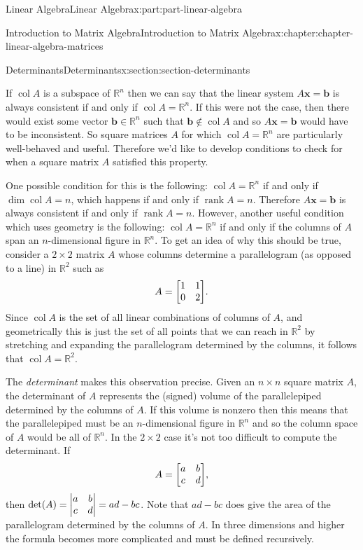\documentclass[twoside,10pt,]{book}
\numberwithin{equation}{part}
\newcommand{\RR}{\mathbb{R}}
\providecommand{\vb}[1]{\mathbf{#1}}
\newcommand{\col}[1]{\operatorname{col}{#1}}
\providecommand{\rank}[1]{\operatorname{rank}{#1}}
\begin{document}
\begin{partptx}{Linear Algebra}{}{Linear Algebra}{}{}{x:part:part-linear-algebra}
\begin{chapterptx}{Introduction to Matrix Algebra}{}{Introduction to Matrix Algebra}{}{}{x:chapter:chapter-linear-algebra-matrices}
\begin{sectionptx}{Determinants}{}{Determinants}{}{}{x:section:section-determinants}
\par
If \(\col{A}\) is a subspace of \(\RR^n\) then we can say that the linear system \(A\vb{x} = \vb{b}\) is always consistent if and only if \(\col{A} = \RR^n\). If this were not the case, then there would exist some vector \(\vb{b}\in\RR^n\) such that \(\vb{b}\notin\col{A}\) and so \(A\vb{x}=\vb{b}\) would have to be inconsistent. So square matrices \(A\) for which \(\col{A}=\RR^n\) are particularly well-behaved and useful. Therefore we'd like to develop conditions to check for when a square matrix \(A\) satisfied this property.%
\par
One possible condition for this is the following: \(\col{A}=\RR^n\) if and only if \(\dim\col{A}=n\), which happens if and only if \(\rank{A}=n\). Therefore \(A\vb{x}=\vb{b}\) is always consistent if and only if \(\rank{A}=n\). However, another useful condition which uses geometry is the following: \(\col{A}=\RR^n\) if and only if the columns of \(A\) span an \(n\)-dimensional figure in \(\RR^n\). To get an idea of why this should be true, consider a \(2\times2\) matrix \(A\) whose columns determine a parallelogram (as opposed to a line) in \(\RR^2\) such as%
\begin{equation*}
A = \mqty[1 & 1 \\ 0 & 2].
\end{equation*}
Since \(\col{A}\) is the set of all linear combinations of columns of \(A\), and geometrically this is just the set of all points that we can reach in \(\RR^2\) by stretching and expanding the parallelogram determined by the columns, it follows that \(\col{A} = \RR^2\).%
\par
The \emph{determinant} makes this observation precise. Given an \(n\times n\) square matrix \(A\), the determinant of \(A\) represents the (signed) volume of the parallelepiped determined by the columns of \(A\). If this volume is nonzero then this means that the parallelepiped must be an \(n\)-dimensional figure in \(\RR^n\) and so the column space of \(A\) would be all of \(\RR^n\). In the \(2\times2\) case it's not too difficult to compute the determinant. If%
\begin{equation*}
A = \mqty[a & b \\ c & d],
\end{equation*}
then \(\det(A) = \mqty|a & b \\ c & d| = ad - bc\). Note that \(ad-bc\) does give the area of the parallelogram determined by the columns of \(A\). In three dimensions and higher the formula becomes more complicated and must be defined recursively.%

\end{sectionptx}
\end{chapterptx}
\end{partptx}
\end{document}
